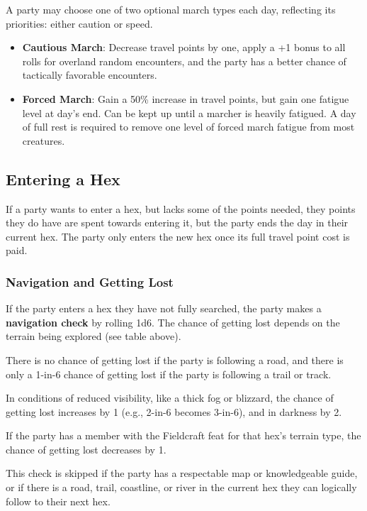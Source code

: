 \documentclass{book}
\providecommand{\tightlist}{%
\setlength{\itemsep}{0pt}\setlength{\parskip}{0pt}}
\begin{document}
A party may choose one of two optional march types each day, reflecting
its priorities: either caution or speed.

\begin{itemize}
\tightlist
\item
  \textbf{Cautious March}: Decrease travel points by one, apply a +1
  bonus to all rolls for overland random encounters, and the party has a
  better chance of tactically favorable encounters.
\item
  \textbf{Forced March}: Gain a 50\% increase in travel points, but gain
  one fatigue level at day's end. Can be kept up until a marcher is
  heavily fatigued. A day of full rest is required to remove one level
  of forced march fatigue from most creatures.
\end{itemize}

\subsection*{Entering a Hex}\label{entering-a-hex}

If a party wants to enter a hex, but lacks some of the points needed,
they points they do have are spent towards entering it, but the party
ends the day in their current hex. The party only enters the new hex
once its full travel point cost is paid.

\subsubsection*{Navigation and Getting
Lost}\label{navigation-and-getting-lost}

If the party enters a hex they have not fully searched, the party makes
a \textbf{navigation check} by rolling 1d6. The chance of getting lost
depends on the terrain being explored (see table above).

There is no chance of getting lost if the party is following a road, and
there is only a 1-in-6 chance of getting lost if the party is following
a trail or track.

In conditions of reduced visibility, like a thick fog or blizzard, the
chance of getting lost increases by 1 (e.g., 2-in-6 becomes 3-in-6), and
in darkness by 2.

If the party has a member with the Fieldcraft feat for that hex's
terrain type, the chance of getting lost decreases by 1.

This check is skipped if the party has a respectable map or
knowledgeable guide, or if there is a road, trail, coastline, or river
in the current hex they can logically follow to their next hex.
\end{document}
